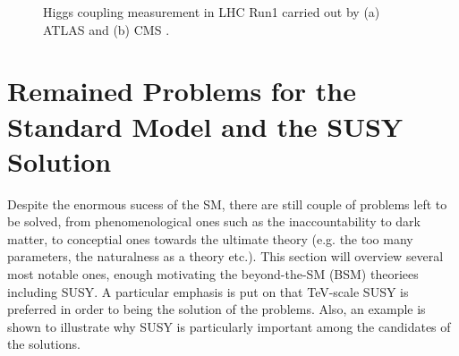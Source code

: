 \begin{figure}[h]
  \centering
    \caption{Higgs coupling measurement in LHC Run1 carried out by (a) ATLAS \cite{ATLASHiggsCouplingRun1} and (b) CMS \cite{CMSHiggsCouplingRun1}. }
    \label{fig::Introduction::higgsCoupling}
\end{figure}




%
%
\clearpage
\section{Remained Problems for the Standard Model and the SUSY Solution} \label{sec::Introduction::homeworkSM}
Despite the enormous sucess of the SM, there are still couple of problems left to be solved,
from phenomenological ones such as the inaccountability to dark matter, 
to conceptial ones towards the ultimate theory (e.g. the too many parameters, the naturalness as a theory etc.).
This section will overview several most notable ones, enough motivating the beyond-the-SM (BSM) theoriees including SUSY.
A particular emphasis is put on that TeV-scale SUSY is preferred in order to being the solution of the
 problems.
Also, an example is shown to  illustrate why SUSY is particularly important among the candidates of the solutions. \\

